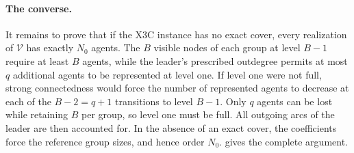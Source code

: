 \documentclass[11pt]{article}
\begin{document}
\paragraph{The converse.}
It remains to prove that if the \textsc{X3C} instance has no exact cover,
every realization of \(\mathcal V\) has exactly \(N_0\) agents.
The \(B\) visible nodes of each group at level \(B-1\) require
at least \(B\) agents, while the leader's prescribed outdegree
permits at most \(q\) additional agents to be represented at
level one.
If level one were not full, strong connectedness would
force the number of represented agents to decrease at each of
the \(B-2=q+1\) transitions to level \(B-1\).
Only \(q\) agents can be lost while retaining \(B\) per group,
so level one must be full.
All outgoing arcs of the leader are then accounted for.
In the absence of an exact cover, the coefficients force the
reference group sizes, and hence order \(N_0\).
 gives the complete argument.

%
\end{document}

